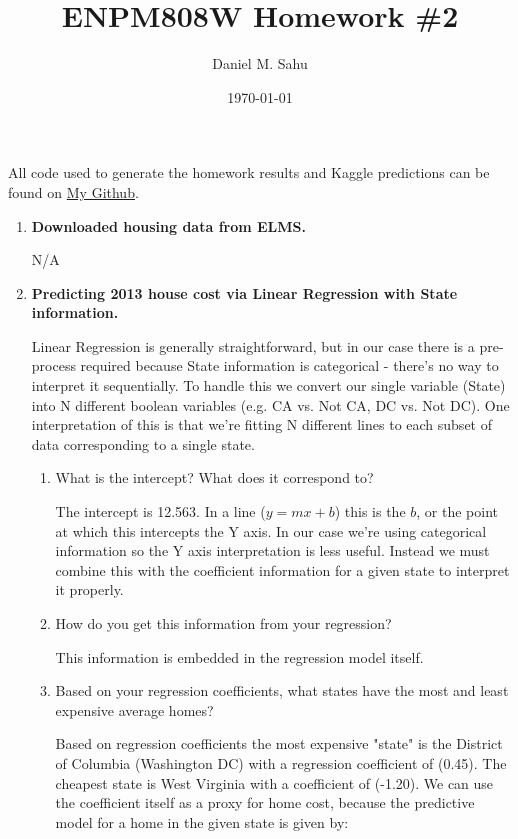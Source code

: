 \documentclass[12pt]{article}
\title{ENPM808W Homework \#2}
\author{Daniel M. Sahu}
\date{\today}
\begin{document}
\maketitle

All code used to generate the homework results and Kaggle predictions can be found on \href{https://github.com/danielmohansahu/data-science-exercises/tree/main/hw2}{My Github}.

\begin{enumerate}[leftmargin=\labelsep]
\item \textbf{Downloaded housing data from ELMS.}

  N/A

\item \textbf{Predicting 2013 house cost via Linear Regression with State information.}

  Linear Regression is generally straightforward, but in our case there is a pre-process required because State information is categorical - there's no way to interpret it sequentially. To handle this we convert our single variable (State) into N different boolean variables (e.g. CA vs. Not CA, DC vs. Not DC). One interpretation of this is that we're fitting N different lines to each subset of data corresponding to a single state.

  \begin{enumerate}[label=(\alph*)]
  \item What is the intercept? What does it correspond to?

    The intercept is 12.563. In a line (\(y = mx + b\)) this is the \(b\), or the point at which this intercepts the Y axis. In our case we're using categorical information so the Y axis interpretation is less useful. Instead we must combine this with the coefficient information for a given state to interpret it properly.

  \item How do you get this information from your regression?

    This information is embedded in the regression model itself.

  \item Based on your regression coefficients, what states have the most and least expensive average homes?

    Based on regression coefficients the most expensive "state" is the District of Columbia (Washington DC) with a regression coefficient of (0.45). The cheapest state is West Virginia with a coefficient of (-1.20). We can use the coefficient itself as a proxy for home cost, because the predictive model for a home in the given state is given by:


\end{enumerate}
\end{enumerate}
\end{document}
